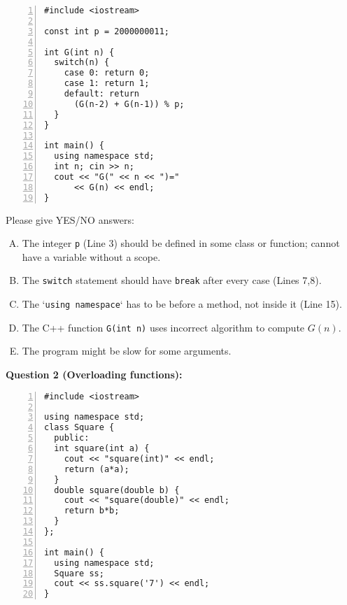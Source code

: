 \documentclass[11pt]{article}
\begin{document}
{\footnotesize
\begin{center}
\begin{minipage}{.8\columnwidth}
\begin{Verbatim}[frame=single,numbers=left]
#include <iostream>

const int p = 2000000011;

int G(int n) { 
  switch(n) {
    case 0: return 0; 
    case 1: return 1;
    default: return 
      (G(n-2) + G(n-1)) % p;
  }
}

int main() {
  using namespace std;
  int n; cin >> n;
  cout << "G(" << n << ")=" 
      << G(n) << endl;
}
\end{Verbatim}
\end{minipage}
\end{center}


Please give YES/NO answers:

\begin{enumerate}[(A)]
\item The integer {\tt p} (Line 3) should be defined in some class or function; cannot have a variable without a scope.
\item The {\tt switch} statement should have {\tt break} after every case (Lines 7,8).
\item The `{\tt using namespace}` has to be before a method, not inside it (Line 15).
\item The C++ function {\tt G(int n)} uses incorrect algorithm to compute $G(n)$.
\item The program might be slow for some arguments.
\end{enumerate}




\vspace{20pt}
{\bf Question 2 (Overloading functions):} 

{\footnotesize
\begin{center}
\begin{minipage}{.8\columnwidth}
\begin{Verbatim}[frame=single,numbers=left]
#include <iostream>
 
using namespace std;
class Square {
  public:
  int square(int a) {
    cout << "square(int)" << endl;  
    return (a*a); 
  }
  double square(double b) { 
    cout << "square(double)" << endl;  
    return b*b; 
  }
};

int main() {
  using namespace std;
  Square ss;
  cout << ss.square('7') << endl;
}
\end{Verbatim}
\end{minipage}
\end{center}
}

}
\end{document}
